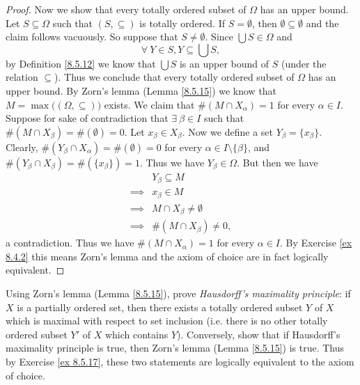 \begin{proof}
    Now we show that every totally ordered subset of \(\Omega\) has an upper bound.
    Let \(S \subseteq \Omega\) such that \((S, \subseteq)\) is totally ordered.
    If \(S = \emptyset\), then \(\emptyset \subseteq \emptyset\) and the claim follows vacuously.
    So suppose that \(S \neq \emptyset\).
    Since \(\bigcup S \in \Omega\) and
    \[
        \forall\ Y \in S, Y \subseteq \bigcup S,
    \]
    by Definition \ref{8.5.12} we know that \(\bigcup S\) is an upper bound of \(S\) (under the relation \(\subseteq\)).
    Thus we conclude that every totally ordered subset of \(\Omega\) has an upper bound.
    By Zorn's lemma (Lemma \ref{8.5.15}) we know that \(M = \max\big((\Omega, \subseteq)\big)\) exists.
    We claim that \(\#(M \cap X_{\alpha}) = 1\) for every \(\alpha \in I\).
    Suppose for sake of contradiction that \(\exists\ \beta \in I\) such that \(\#(M \cap X_{\beta}) = \#(\emptyset) = 0\).
    Let \(x_{\beta} \in X_{\beta}\).
    Now we define a set \(Y_{\beta} = \{x_{\beta}\}\).
    Clearly, \(\#(Y_{\beta} \cap X_{\alpha}) = \#(\emptyset) = 0\) for every \(\alpha \in I \setminus \{\beta\}\), and \(\#(Y_{\beta} \cap X_{\beta}) = \#(\{x_{\beta}\}) = 1\).
    Thus we have \(Y_{\beta} \in \Omega\).
    But then we have
    \begin{align*}
                 & Y_{\beta} \subseteq M           \\
        \implies & x_{\beta} \in M                 \\
        \implies & M \cap X_{\beta} \neq \emptyset \\
        \implies & \#(M \cap X_{\beta}) \neq 0,
    \end{align*}
    a contradiction.
    Thus we have \(\#(M \cap X_{\alpha}) = 1\) for every \(\alpha \in I\).
    By Exercise \ref{ex 8.4.2} this means Zorn's lemma and the axiom of choice are in fact logically equivalent.
\end{proof}

\begin{exercise}\label{ex 8.5.18}
    Using Zorn's lemma (Lemma \ref{8.5.15}), prove \emph{Hausdorff's maximality principle}:
    if \(X\) is a partially ordered set, then there exists a totally ordered subset \(Y\) of \(X\) which is maximal with respect to set inclusion
    (i.e. there is no other totally ordered subset \(Y'\) of \(X\) which contains \(Y\)).
    Conversely, show that if Hausdorff's maximality principle is true, then Zorn's lemma (Lemma \ref{8.5.15}) is true.
    Thus by Exercise \ref{ex 8.5.17}, these two statements are logically equivalent to the axiom of choice.
\end{exercise}

